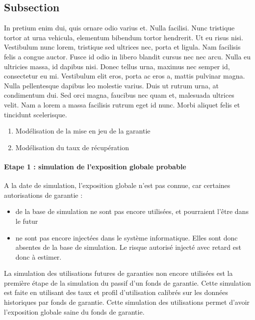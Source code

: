 \documentclass[12pt,a4paper]{report}
\begin{document}
\subsection{Subsection}

In pretium enim dui, quis ornare odio varius et. Nulla facilisi. Nunc tristique tortor at urna vehicula, elementum bibendum tortor hendrerit. Ut eu risus nisi. Vestibulum nunc lorem, tristique sed ultrices nec, porta et ligula. Nam facilisis felis a congue auctor. Fusce id odio in libero blandit cursus nec nec arcu. Nulla eu ultricies massa, id dapibus nisi. Donec tellus urna, maximus nec semper id, consectetur eu mi. Vestibulum elit eros, porta ac eros a, mattis pulvinar magna. Nulla pellentesque dapibus leo molestie varius. Duis ut rutrum urna, at condimentum dui. Sed orci magna, faucibus nec quam et, malesuada ultrices velit. Nam a lorem a massa facilisis rutrum eget id nunc. Morbi aliquet felis et tincidunt scelerisque. 

\begin{enumerate}
    \item Modélisation de la mise en jeu de la garantie
    \item Modélisation du taux de récupération
\end{enumerate}

\paragraph{Etape 1 : simulation de l'exposition globale probable}
A la date de simulation, l’exposition globale n’est pas connue, car certaines autorisations de garantie :

\begin{itemize}
    \item de la base de simulation ne sont pas encore utilisées, et pourraient l’être dans le futur
    \item 	ne sont pas encore injectées dans le système informatique. Elles sont donc absentes de la base de simulation. Le risque autorisé injecté avec retard est donc à estimer.
\end{itemize}


La simulation des utilisations futures de garanties non encore utilisées est la première étape de la simulation du passif d’un fonds de garantie. Cette simulation est faite en utilisant des taux et profil d’utilisation calibrés sur les données historiques par fonds de garantie.  Cette simulation des utilisations permet d’avoir l’exposition globale saine du fonds de garantie.
\end{document}
